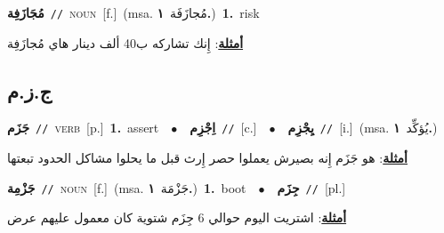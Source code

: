 \documentclass[10pt,a4paper,twoside]{article} %
\begin{document}
\begin{multicols}{2}
{\setlength\topsep{0pt}\textbf{\foreignlanguage{arabic}{مُجَازَفِة}}\ {\color{gray}\texttt{//}\color{black}}\ \textsc{noun}\ [f.]\ \color{gray}(msa. \foreignlanguage{arabic}{مُجازَفَة}~\foreignlanguage{arabic}{\textbf{١.}})\color{black}\ \textbf{1.}~risk\  \begin{flushright}\color{gray}\foreignlanguage{arabic}{\textbf{\underline{\foreignlanguage{arabic}{أمثلة}}}: إِنك تشاركه ب40 ألف دينار هاي مُجازَفِة}\end{flushright}\color{black}} \vspace{2mm}

\vspace{-3mm}
\subsection*{\color{blue}\foreignlanguage{arabic}{ج.ز.م}\color{blue}{}} 

{\setlength\topsep{0pt}\textbf{\foreignlanguage{arabic}{جَزَم}}\ {\color{gray}\texttt{//}\color{black}}\ \textsc{verb}\ [p.]\ \textbf{1.}~assert\ \ $\bullet$\ \ \setlength\topsep{0pt}\textbf{\foreignlanguage{arabic}{اِجْزِم}}\ {\color{gray}\texttt{//}\color{black}}\ [c.]\ \ $\bullet$\ \ \setlength\topsep{0pt}\textbf{\foreignlanguage{arabic}{يِجْزِم}}\ {\color{gray}\texttt{//}\color{black}}\ [i.]\ \color{gray}(msa. \foreignlanguage{arabic}{يُؤكِّد}~\foreignlanguage{arabic}{\textbf{١.}})\color{black}\  \begin{flushright}\color{gray}\foreignlanguage{arabic}{\textbf{\underline{\foreignlanguage{arabic}{أمثلة}}}: هو جَزَم إِنه بصيرش يعملوا حصر إِرث قبل ما يحلوا مشاكل الحدود تبعتها}\end{flushright}\color{black}} \vspace{2mm}

{\setlength\topsep{0pt}\textbf{\foreignlanguage{arabic}{جَزْمِة}}\ {\color{gray}\texttt{//}\color{black}}\ \textsc{noun}\ [f.]\ \color{gray}(msa. \foreignlanguage{arabic}{جَزْمَة}~\foreignlanguage{arabic}{\textbf{١.}})\color{black}\ \textbf{1.}~boot\ \ $\bullet$\ \ \setlength\topsep{0pt}\textbf{\foreignlanguage{arabic}{جِزَم}}\ {\color{gray}\texttt{//}\color{black}}\ [pl.]\  \begin{flushright}\color{gray}\foreignlanguage{arabic}{\textbf{\underline{\foreignlanguage{arabic}{أمثلة}}}: اشتريت اليوم حوالي 6 جِزَم شتوية كان معمول عليهم عرض}\end{flushright}\color{black}} \vspace{2mm}


\end{multicols}
\end{document}
